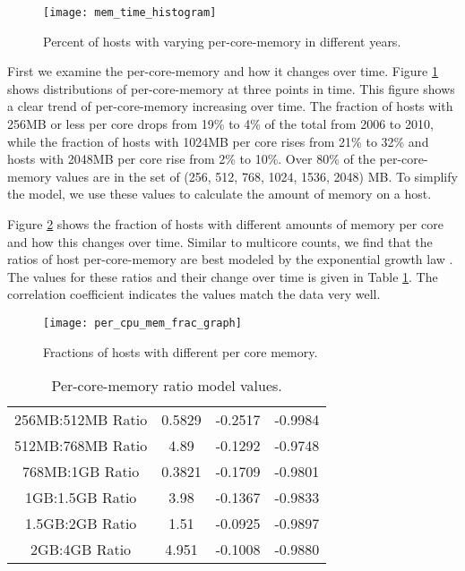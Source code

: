 \documentclass[conference]{IEEEtran}
\begin{document}
\begin{figure}[!t]
\centering
\texttt{[image: mem\_time\_histogram]}
\caption{Percent of hosts with varying per-core-memory in different years.}
\label{fig-mem-time-hist}
\end{figure}

First we examine the per-core-memory and how it changes over time.  Figure \ref{fig-mem-time-hist} shows distributions of per-core-memory at three points in time.  This figure shows a clear trend of per-core-memory increasing over time.  The fraction of hosts with 256MB or less per core drops from 19\% to 4\% of the total from 2006 to 2010, while the fraction of hosts with 1024MB per core rises from 21\% to 32\% and hosts with 2048MB per core rise from 2\% to 10\%.  Over 80\% of the per-core-memory values are in the set of (256, 512, 768, 1024, 1536, 2048) MB.  To simplify the model, we use these values to calculate the amount of memory on a host.

Figure \ref{fig-per-cpumem-frac-graph} shows the fraction of hosts with different amounts of memory per core and how this changes over time.  Similar to multicore counts, we find that the ratios of host per-core-memory are best modeled by the exponential growth law .  The values for these ratios and their change over time is given in Table \ref{mem-ratio-val-table}.  The correlation coefficient  indicates the values match the data very well.

\begin{figure}[!t]
\centering
\texttt{[image: per\_cpu\_mem\_frac\_graph]}
\caption{Fractions of hosts with different per core memory.}
\label{fig-per-cpumem-frac-graph}
\end{figure}

\begin{table}
\caption{Per-core-memory ratio model values.}
\centering
\begin{tabular}{|c|c|c|c|}
\hline
&  &  &  \\
\hline
256MB:512MB Ratio & 0.5829 & -0.2517 & -0.9984 \\
\hline
512MB:768MB Ratio & 4.89 & -0.1292 & -0.9748 \\
\hline
768MB:1GB Ratio & 0.3821 & -0.1709 & -0.9801 \\
\hline
1GB:1.5GB Ratio & 3.98 & -0.1367 & -0.9833 \\
\hline
1.5GB:2GB Ratio & 1.51 & -0.0925 & -0.9897 \\
\hline
2GB:4GB Ratio & 4.951 & -0.1008 & -0.9880 \\
\hline
\end{tabular}
\label{mem-ratio-val-table}
\end{table}
\end{document}
